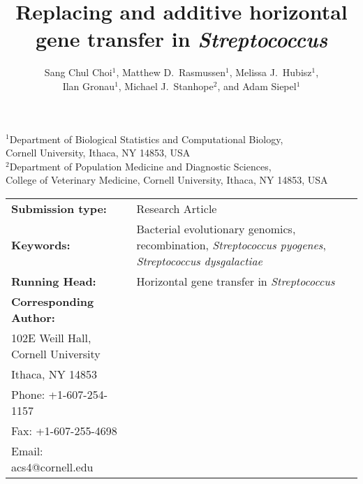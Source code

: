 \documentclass[12pt]{article}
\date{}
\begin{document}
\begin{titlepage}

\title{Replacing and additive horizontal \\
gene transfer in {\em Streptococcus} }

\author{Sang Chul Choi$^{1}$, Matthew D.\ Rasmussen$^{1}$, 
Melissa J.\ Hubisz$^{1}$, \\
Ilan Gronau$^{1}$,
Michael J.\ Stanhope$^{2}$, and Adam Siepel$^{1}$}

\date{ }
\maketitle

\begin{footnotesize}
\begin{center}
$^1$Department of Biological Statistics and Computational Biology,\\
Cornell University, Ithaca, NY 14853, USA
\\[1ex]
$^2$Department of Population Medicine and Diagnostic Sciences,\\
College of Veterinary Medicine, Cornell University, Ithaca, NY 14853, USA
\\
\end{center}
\end{footnotesize}

\vspace{1in}

\begin{tabular}{lp{4.5in}}
{\bf Submission type:}& Research Article
\vspace{1ex}\\
{\bf Keywords:}&Bacterial evolutionary
genomics, recombination, {\em Streptococcus pyogenes}, {\em Streptococcus
  dysgalactiae} 
\vspace{1ex}\\
{\bf Running Head:}&Horizontal gene transfer in {\em Streptococcus}
\vspace{1ex}\\ 
{\bf Corresponding Author:}&
\begin{minipage}[t]{4in}
 Adam Siepel\\
 102E Weill Hall, Cornell University\\
 Ithaca, NY 14853\\
 Phone: +1-607-254-1157\\
 Fax: +1-607-255-4698\\
 Email: acs4@cornell.edu
\end{minipage}
\end{tabular}

\thispagestyle{empty}
\end{titlepage}
\end{document}
